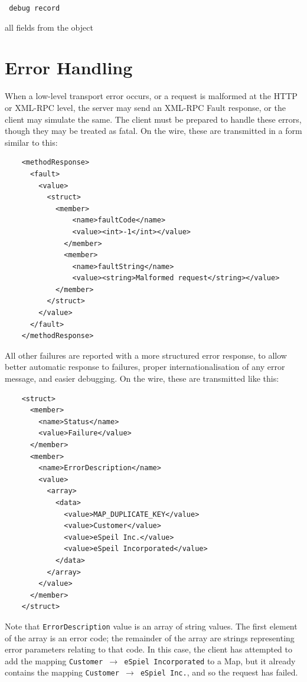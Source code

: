\vspace{0.3cm}

{\tt 
debug record
}


all fields from the object
\vspace{0.3cm}
\vspace{0.3cm}
\vspace{0.3cm}

\vspace{1cm}
\newpage
\section{Error Handling}
When a low-level transport error occurs, or a request is malformed at the HTTP
or XML-RPC level, the server may send an XML-RPC Fault response, or the client
may simulate the same.  The client must be prepared to handle these errors,
though they may be treated as fatal.  On the wire, these are transmitted in a
form similar to this:

\begin{verbatim}
    <methodResponse>
      <fault>
        <value>
          <struct>
            <member>
                <name>faultCode</name>
                <value><int>-1</int></value>
              </member>
              <member>
                <name>faultString</name>
                <value><string>Malformed request</string></value>
            </member>
          </struct>
        </value>
      </fault>
    </methodResponse>
\end{verbatim}

All other failures are reported with a more structured error response, to
allow better automatic response to failures, proper internationalisation of
any error message, and easier debugging.  On the wire, these are transmitted
like this:

\begin{verbatim}
    <struct>
      <member>
        <name>Status</name>
        <value>Failure</value>
      </member>
      <member>
        <name>ErrorDescription</name>
        <value>
          <array>
            <data>
              <value>MAP_DUPLICATE_KEY</value>
              <value>Customer</value>
              <value>eSpeil Inc.</value>
              <value>eSpeil Incorporated</value>
            </data>
          </array>
        </value>
      </member>
    </struct>
\end{verbatim}

Note that {\tt ErrorDescription} value is an array of string values. The
first element of the array is an error code; the remainder of the array are
strings representing error parameters relating to that code.  In this case,
the client has attempted to add the mapping {\tt Customer $\rightarrow$
eSpiel Incorporated} to a Map, but it already contains the mapping
{\tt Customer $\rightarrow$ eSpiel Inc.}, and so the request has failed.

